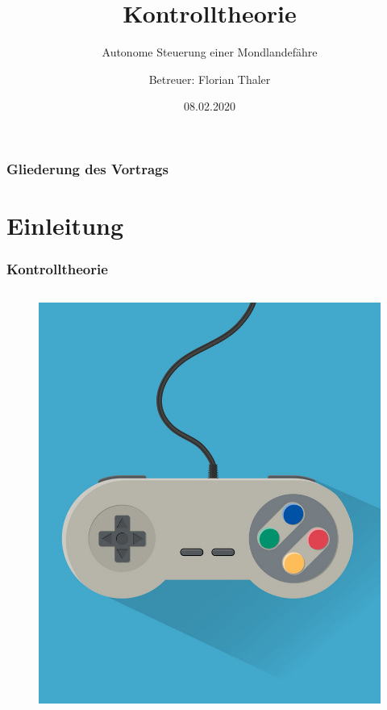 \documentclass{beamer}
\title{Kontrolltheorie}
\subtitle{Autonome Steuerung einer Mondlandefähre}
\author{Betreuer: Florian Thaler}
\date{08.02.2020}
\begin{document}
	\begin{frame}[plain]
		\titlepage
	\end{frame}

	\begin{frame}
		\frametitle{Gliederung des Vortrags}
		\tableofcontents
	\end{frame}

	\section{Einleitung}
		
		\begin{frame}
 			\frametitle{Kontrolltheorie}
 			\begin{columns}
				\begin{column}{0.48\textwidth}
					\begin{figure}
						\includegraphics[scale = 0.15]{images/controller.jpg}	
					\end{figure}
				\end{column}

\end{columns}
\end{frame}
\end{document}
